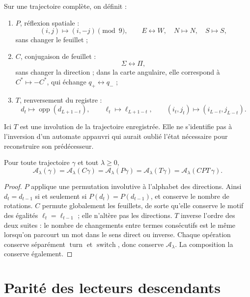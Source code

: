 \begin{definition}
\label{def:cpt-discreto-rutas-rev6}
Sur une trajectoire complète, on définit :
\begin{enumerate}
\item \(P\), réflexion spatiale :
\[
 (i,j)\longmapsto(i,-j)\pmod9,
 \qquad E\leftrightarrow W,\quad N\mapsto N,\quad S\mapsto S,
\]
sans changer le feuillet ;
\item \(C\), conjugaison de feuillet :
\[
 \Sigma\leftrightarrow\Pi,
\]
sans changer la direction ; dans la carte angulaire, elle correspond à
\(C^*\mapsto-C^*\), qui échange \(q_+\leftrightarrow q_-\) ;
\item \(T\), renversement du registre :
\[
 d_t\longmapsto\operatorname{opp}(d_{L+1-t}),
 \qquad
 \ell_t\longmapsto\ell_{L+1-t},
 \qquad
 (i_t,j_t)\longmapsto(i_{L-t},j_{L-t}).
\]
\end{enumerate}
\end{definition}

Ici \(T\) est une involution de la trajectoire enregistrée. Elle ne s'identifie pas
à l'inversion d'un automate appauvri qui aurait oublié l'état nécessaire
pour reconstruire son prédécesseur.

\begin{theorem}
\label{thm:invariancia-cpt-discreta-rev6}
Pour toute trajectoire \(\gamma\) et tout \(\lambda\geq0\),
\[
 \boxed{
 \mathcal A_\lambda(\gamma)
 =
 \mathcal A_\lambda(C\gamma)
 =
 \mathcal A_\lambda(P\gamma)
 =
 \mathcal A_\lambda(T\gamma)
 =
 \mathcal A_\lambda(CPT\,\gamma).}
\]
\end{theorem}

\begin{proof}
\(P\) applique une permutation involutive à l'alphabet des directions. Ainsi
\(d_t=d_{t-1}\) si et seulement si
\(P(d_t)=P(d_{t-1})\), et conserve le nombre de rotations. \(C\) permute
globalement les feuillets, de sorte qu'elle conserve le motif des égalités
\(\ell_t=\ell_{t-1}\) ; elle n'altère pas les directions. \(T\) inverse l'ordre des
deux suites : le nombre de changements entre termes consécutifs est le
même lorsqu'on parcourt un mot dans le sens direct ou inverse. Chaque opération
conserve séparément \(\operatorname{turn}\) et
\(\operatorname{switch}\), donc conserve
\(\mathcal A_\lambda\). La composition la conserve également.
\end{proof}

\section{Parité des lecteurs descendants}

